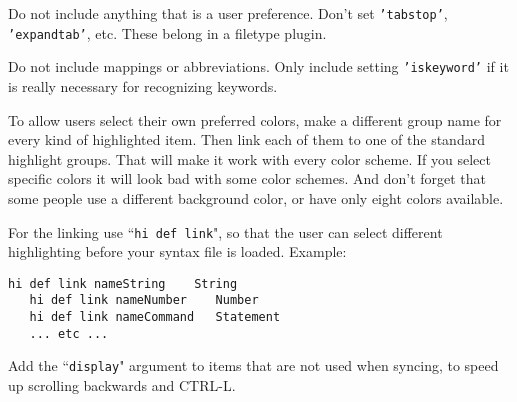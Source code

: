 Do not include anything that is a user preference.
Don't set \texttt{'tabstop'}, \texttt{'expandtab'}, etc.
These belong in a filetype plugin.

Do not include mappings or abbreviations.
Only include setting \texttt{'iskeyword'} if it is really necessary for recognizing keywords.

To allow users select their own preferred colors, make a different group name for every kind of highlighted item.
Then link each of them to one of the standard highlight groups.
That will make it work with every color scheme.
If you select specific colors it will look bad with some color schemes.
And don't forget that some people use a different background color, or have only eight colors available.

For the linking use ``\texttt{hi def link}", so that the user can select different highlighting before your syntax file is loaded.
Example:

\begin{Verbatim}[samepage=true]
   hi def link nameString    String
   hi def link nameNumber    Number
   hi def link nameCommand   Statement
   ... etc ...
\end{Verbatim}

Add the ``\texttt{display}" argument to items that are not used when syncing, to speed up scrolling backwards and CTRL-L.
\clearpage
